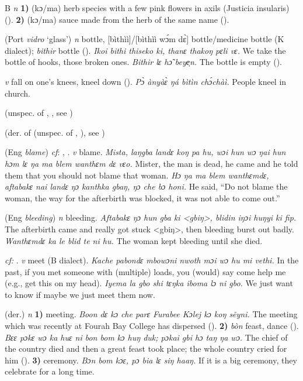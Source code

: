 \begin{letter}{B}
 \textit{n} \textbf{1)} (kɔ/ma) herb species with a few pink flowers in axils (Justicia insularis) (\citealt{Pichl1967}). \textbf{2)} (kɔ/ma) sauce made from the herb of the same name (\citealt{Pichl1967}). 

 (Port \textit{vidro} ‘glass') \textit{n} bottle, [bìthìì]/[bìthìì wɔ́m dɛ̀] bottle/medicine bottle (K dialect); \textit{bithir} bottle (\citealt{Pichl1967}). \textit{Ikoi bithi thiseko ki, thanɛ thakoŋ pɛli vɛ.} We take the bottle of hooks, those broken ones. \textit{Bithir lɛ hɔ̃ beye̹n.} The bottle is empty (\citealt{Pichl1967}). 

 \textit{v} fall on one's knees, kneel down (\citealt{Pichl1967}). \textit{Pɔ̀ ànyàɛ̀ ŋá bìtìn chɔ́chàì.} People kneel in church.

 (unspec. of , , see )

 (der. of  (unspec. of , ), see ) 

 (Eng \textit{blame}) \textit{cf}: , . \textit{v} blame. \textit{Mista, laŋgba landɛ koŋ pa hu, wɔi hun wɔ ŋai hun hɔm lɛ ŋa ma blem wanthɛm dɛ vɛo.} Mister, the man is dead, he came and he told them that you should not blame that woman. \textit{Hɔ ŋa ma blem wanthɛmdɛ, aftabakɛ nai landɛ ŋɔ kanthka gbaŋ, ŋɔ che bɔ honi.} He said, “Do not blame the woman, the way for the afterbirth was blocked, it was not able to come out.”

 (Eng \textit{bleeding}) \textit{n} bleeding. \textit{Aftabakɛ ŋɔ hun gba ki <gbiŋ>, blidin iŋɔi huŋyi ki fip.} The afterbirth came and really got stuck <gbiŋ>, then bleeding burst out badly. \textit{Wanthɛmdɛ ka le blid te ni hu.} The woman kept bleeding until she died.

 \textit{cf:} . \textit{v} meet (B dialect). \textit{Kache pabondɛ mbowɔni nwoth mɔi wɔ hu mi vethi.} In the past, if you met someone with (multiple) loads, you (would) say come help me (e.g., get this on my head). \textit{Iyema la gbo shi tɛŋka iboma lɔ ni gbo.} We just want to know if maybe we just meet them now.

 (der.) \textit{n} \textbf{1)} meeting. \textit{Boon dɛ kɔ che parɛ Furabee Kɔlej kɔ koŋ sẽyni.} The meeting which was recently at Fourah Bay College has dispersed (\citealt{Pichl1967}). \textbf{2)} \textit{bòn} feast, dance (\citealt{Sumner1921}). \textit{Bɛɛ pɔkɛ wɔ ka huɛ ni bon bom kɔ huŋ duk; pɔkai gbi hɔ taŋ ŋa wɔ.} The chief of the country died and then a great feast took place; the whole country cried for him (\citealt{Sumner1921}). \textbf{3)} ceremony. \textit{Bɔn bom kɔɛ, pɔ bia lɛ siŋ haaŋ.} If it is a big ceremony, they celebrate for a long time.


\end{letter}

